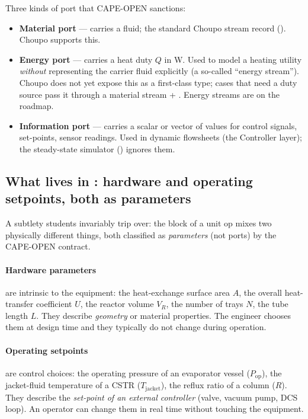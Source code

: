\documentclass[11pt,a4paper]{article}
\begin{document}
\noindent Three kinds of port that CAPE-OPEN sanctions:

\begin{itemize}[leftmargin=*,nosep,topsep=2pt]
  \item \textbf{Material port} --- carries a fluid; the standard
        Choupo stream record ().  Choupo supports this.
  \item \textbf{Energy port} --- carries a heat duty $Q$ in W.
        Used to model a heating utility \emph{without} representing
        the carrier fluid explicitly (a so-called ``energy stream'').
        Choupo does not yet expose this as a first-class type;
        cases that need a duty source pass it through a material
        stream + .  Energy streams
        are on the roadmap.
  \item \textbf{Information port} --- carries a scalar or vector
        of values for control signals, set-points, sensor readings.
        Used in dynamic flowsheets (the 
        Controller layer); the steady-state simulator
        () ignores them.
\end{itemize}

\subsection{What lives in : hardware and operating
            setpoints, both as parameters}\label{ch:hardware-vs-setpoints}

A subtlety students invariably trip over: the  block of a unit op mixes two physically different
things, both classified as \emph{parameters} (not ports) by the
CAPE-OPEN contract.

\paragraph{Hardware parameters} are intrinsic to the equipment:
the heat-exchange surface area $A$, the overall heat-transfer
coefficient $U$, the reactor volume $V_R$, the number of trays
$N$, the tube length $L$.  They describe \emph{geometry} or
material properties.  The engineer chooses them at design time
and they typically do not change during operation.

\paragraph{Operating setpoints} are control choices: the
operating pressure of an evaporator vessel ($P_{\!\text{op}}$),
the jacket-fluid temperature of a CSTR ($T_{\!\text{jacket}}$),
the reflux ratio of a column ($R$).  They describe the
\emph{set-point of an external controller} (valve, vacuum pump,
DCS loop).  An operator can change them in real time without
touching the equipment.
\end{document}

